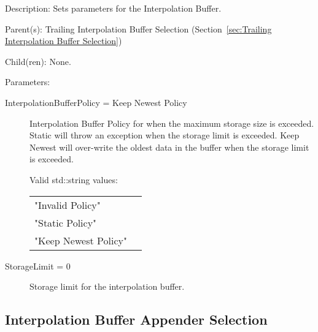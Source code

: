 \begin{list}{}
  {\setlength{\leftmargin}{1.0in}
   \setlength{\labelwidth}{0.75in}
   \setlength{\labelsep}{0.125in}}
  \item[Description:]
    Sets parameters for the Interpolation Buffer.
  \item[Parent(s):]
    Trailing Interpolation Buffer Selection (Section~\ref{sec:Trailing Interpolation Buffer Selection})
  \item[Child(ren):]
    None. 
  \item[Parameters:]
    \begin{description}
      \item[InterpolationBufferPolicy = Keep Newest Policy] 
Interpolation Buffer Policy for when the maximum storage size is exceeded.  Static will throw an exception when the storage limit is exceeded.  Keep Newest will over-write the oldest data in the buffer when the storage limit is exceeded.

  Valid std::string values:

      \begin{tabular}{lp{}}
      "Invalid Policy" & \\ 
      "Static Policy" & \\ 
      "Keep Newest Policy" & \\ 
      \end{tabular}
      \item[StorageLimit = 0] 
Storage limit for the interpolation buffer.
\end{description}

\end{list}

\subsection{Interpolation Buffer Appender Selection}
\label{sec:Interpolation Buffer Appender Selection}

